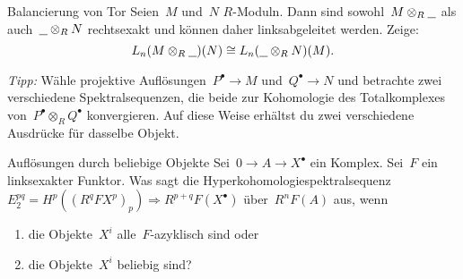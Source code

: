 \documentclass{uebblatt}
\begin{document}
\begin{aufgabe}{Balancierung von Tor}
Seien~$M$ und~$N$ $R$-Moduln. Dann sind sowohl~$M \otimes_R \underline{\ \ }$
als auch~$\underline{\ \ } \otimes_R N$ rechtsexakt und können daher
linksabgeleitet werden. Zeige:
\[ L_n(M \otimes_R \underline{\ \ })(N) \cong L_n(\underline{\ \ } \otimes_R
N)(M). \]
{\tiny\emph{Tipp:} Wähle projektive Auflösungen~$P^\bullet \to M$
und~$Q^\bullet \to N$ und betrachte zwei verschiedene Spektralsequenzen, die
beide zur Kohomologie des Totalkomplexes von~$P^\bullet \otimes_R Q^\bullet$
konvergieren. Auf diese Weise erhältst du zwei verschiedene Ausdrücke für
dasselbe Objekt.\par}
\end{aufgabe}

\begin{aufgabe}{Auflösungen durch beliebige Objekte}
Sei~$0 \to A \to X^\bullet$ ein Komplex. Sei~$F$ ein linksexakter Funktor. Was
sagt die Hyperkohomologiespektralsequenz
$E^{pq}_2 = H^p((R^q F X^p)_p) \Rightarrow R^{p+q}F(X^\bullet)$ über~$R^nF(A)$ aus,
wenn
\begin{enumerate}
\item die Objekte~$X^i$ alle~$F$-azyklisch sind oder
\item die Objekte~$X^i$ beliebig sind?
\end{enumerate}
\end{aufgabe}
\end{document}
